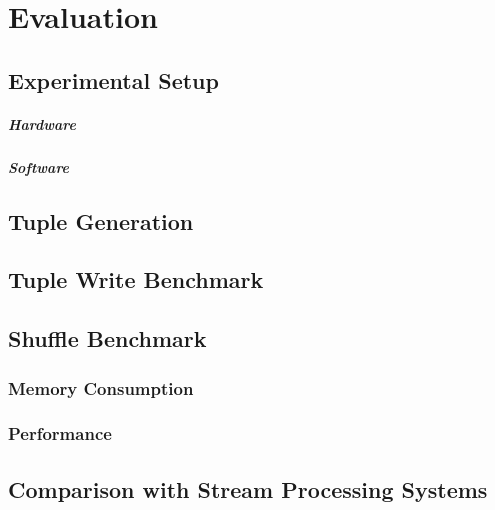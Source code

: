 
\chapter{Evaluation}\label{chapter:evaluation}

\section{Experimental Setup}

\paragraph{Hardware}
\paragraph{Software}

\section{Tuple Generation}

\section{Tuple Write Benchmark}

\section{Shuffle Benchmark}

\subsection{Memory Consumption}
\subsection{Performance}

\section{Comparison with Stream Processing Systems}

